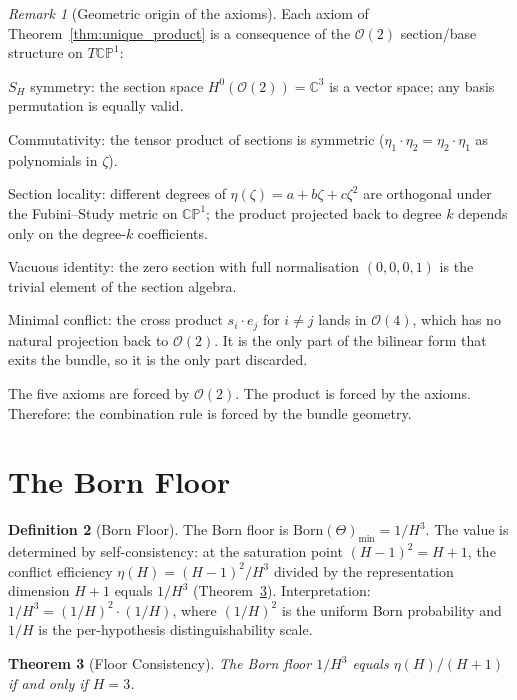 \documentclass[11pt,a4paper]{article}
\newtheorem{theorem}{Theorem}[section]
\theoremstyle{definition}
\newtheorem{definition}[theorem]{Definition}
\theoremstyle{remark}
\newtheorem{remark}[theorem]{Remark}
\newcommand{\CP}{\mathbb{CP}}
\newcommand{\C}{\mathbb{C}}
\begin{document}
\begin{remark}[Geometric origin of the axioms]\label{rem:axiom_geometry}
Each axiom of Theorem~\ref{thm:unique_product} is a consequence of the $\mathcal{O}(2)$ section/base structure on $T\CP^1$:

$S_H$ symmetry: the section space $H^0(\mathcal{O}(2))=\C^3$ is a vector space; any basis permutation is equally valid.

Commutativity: the tensor product of sections is symmetric ($\eta_1\cdot\eta_2=\eta_2\cdot\eta_1$ as polynomials in $\zeta$).

Section locality: different degrees of $\eta(\zeta)=a+b\zeta+c\zeta^2$ are orthogonal under the Fubini--Study metric on $\CP^1$; the product projected back to degree $k$ depends only on the degree-$k$ coefficients.

Vacuous identity: the zero section with full normalisation $(0,0,0,1)$ is the trivial element of the section algebra.

Minimal conflict: the cross product $s_i\cdot e_j$ for $i\neq j$ lands in $\mathcal{O}(4)$, which has no natural projection back to $\mathcal{O}(2)$. It is the only part of the bilinear form that exits the bundle, so it is the only part discarded.

The five axioms are forced by $\mathcal{O}(2)$. The product is forced by the axioms. Therefore: the combination rule is forced by the bundle geometry.
\end{remark}


\section{The Born Floor}\label{sec:floor}

\begin{definition}[Born Floor]\label{def:bornfloor}
The Born floor is $\mathrm{Born}(\Theta)_{\min}=1/H^3$. The value is determined by self-consistency: at the saturation point $(H-1)^2=H+1$, the conflict efficiency $\eta(H)=(H-1)^2/H^3$ divided by the representation dimension $H+1$ equals $1/H^3$ (Theorem~\ref{thm:floorconsist}). Interpretation: $1/H^3=(1/H)^2\cdot(1/H)$, where $(1/H)^2$ is the uniform Born probability and $1/H$ is the per-hypothesis distinguishability scale.
\end{definition}

\begin{theorem}[Floor Consistency]\label{thm:floorconsist}
The Born floor $1/H^3$ equals $\eta(H)/(H+1)$ if and only if $H=3$.
\end{theorem}
\end{document}
